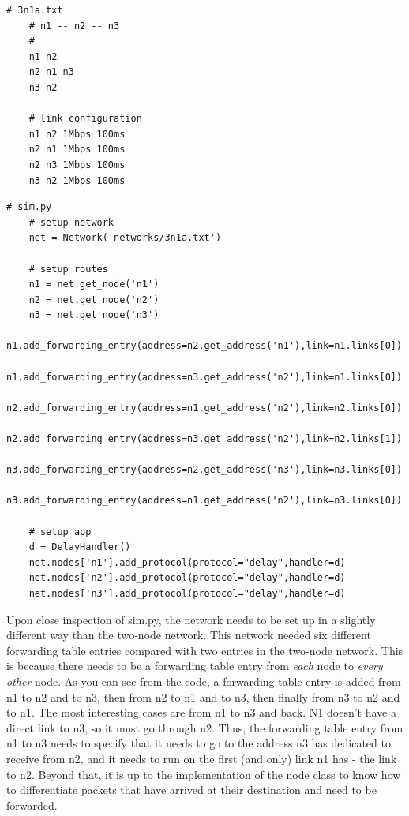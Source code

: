 \documentclass[11pt]{article}
\begin{document}
\vspace{5mm}
\begin{absolutelynopagebreak}
\begin{lstlisting}
# 3n1a.txt
    # n1 -- n2 -- n3
    #
    n1 n2
    n2 n1 n3
    n3 n2

    # link configuration
    n1 n2 1Mbps 100ms
    n2 n1 1Mbps 100ms
    n2 n3 1Mbps 100ms
    n3 n2 1Mbps 100ms
\end{lstlisting}
\end{absolutelynopagebreak}

\vspace{5mm}

\begin{absolutelynopagebreak}
\begin{lstlisting}
# sim.py
    # setup network
    net = Network('networks/3n1a.txt')

    # setup routes
    n1 = net.get_node('n1')
    n2 = net.get_node('n2')
    n3 = net.get_node('n3')
    n1.add_forwarding_entry(address=n2.get_address('n1'),link=n1.links[0])
    n1.add_forwarding_entry(address=n3.get_address('n2'),link=n1.links[0])
    n2.add_forwarding_entry(address=n1.get_address('n2'),link=n2.links[0])
    n2.add_forwarding_entry(address=n3.get_address('n2'),link=n2.links[1])
    n3.add_forwarding_entry(address=n2.get_address('n3'),link=n3.links[0])
    n3.add_forwarding_entry(address=n1.get_address('n2'),link=n3.links[0])

    # setup app
    d = DelayHandler()
    net.nodes['n1'].add_protocol(protocol="delay",handler=d)
    net.nodes['n2'].add_protocol(protocol="delay",handler=d)
    net.nodes['n3'].add_protocol(protocol="delay",handler=d)
\end{lstlisting}
\end{absolutelynopagebreak}
\vspace{5mm}

Upon close inspection of sim.py, the network needs to be set up in a slightly different way than the two-node network. This network needed six different forwarding table entries compared with two entries in the two-node network. This is because there needs to be a forwarding table entry from \emph{each} node to \emph{every other} node. As you can see from the code, a forwarding table entry is added from n1 to n2 and to n3, then from n2 to n1 and to n3, then finally from n3 to n2 and to n1. The most interesting cases are from n1 to n3 and back. N1 doesn't have a direct link to n3, so it must go through n2. Thus, the forwarding table entry from n1 to n3 needs to specify that it needs to go to the address n3 has dedicated to receive from n2, and it needs to run on the first (and only) link n1 has - the link to n2. Beyond that, it is up to the implementation of the node class to know how to differentiate packets that have arrived at their destination and need to be forwarded.
\end{document}
